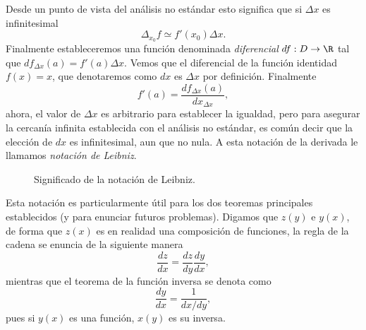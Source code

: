 \documentclass[11pt,oneside,a4paper]{book}
\begin{document}
Desde un punto de vista del análisis no estándar esto significa que si $\Delta x$ es infinitesimal
$$\Delta_{x_0}f\simeq f'(x_0)\Delta x.$$
Finalmente estableceremos una función denominada \textit{diferencial} $df:D\rightarrow\R$ tal que $df_{\Delta x}(a)=f'(a)\Delta x$. Vemos que el diferencial de la función identidad $f(x)=x$, que denotaremos como $dx$ es $\Delta x$ por definición. Finalmente
$$f'(a)=\frac{df_{\Delta x}(a)}{dx_{\Delta x}},$$
ahora, el valor de $\Delta x$ es arbitrario para establecer la igualdad, pero para asegurar la cercanía infinita establecida con el análisis no estándar, es común decir que la elección de $dx$ es infinitesimal, aun que no nula. A esta notación de la derivada le llamamos \textit{notación de Leibniz}.
\begin{figure}
\centering
{}
\caption{Significado de la notación de Leibniz.}
\end{figure}

Esta notación es particularmente útil para los dos teoremas principales establecidos (y para enunciar futuros problemas). Digamos que $z(y)$ e $y(x)$, de forma que $z(x)$ es en realidad una composición de funciones, la regla de la cadena se enuncia de la siguiente manera
$$\frac{dz}{dx}=\frac{dz}{dy}\frac{dy}{dx},$$
mientras que el teorema de la función inversa se denota como
$$\frac{dy}{dx}=\frac{1}{dx/dy},$$
pues si $y(x)$ es una función, $x(y)$ es su inversa.
\end{document}
